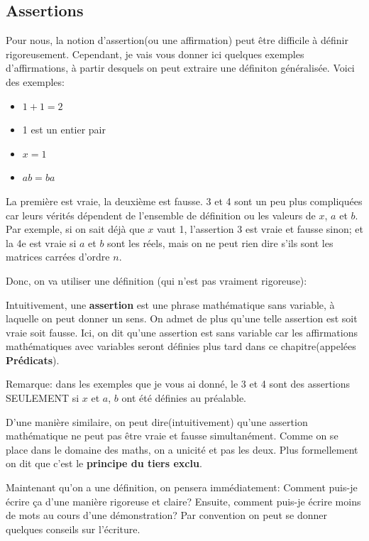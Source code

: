 \documentclass{article}
\begin{document}
\subsection{Assertions}

Pour nous, la notion d'assertion(ou une affirmation) peut être difficile à définir rigoreusement. Cependant, je vais vous donner ici quelques exemples d'affirmations, à partir desquels on peut extraire une définiton généralisée. Voici des exemples:

\begin{itemize}
  \item $1+1=2$
  \item 1 est un entier pair
  \item $x=1$
  \item $ab = ba$
\end{itemize}

La première est vraie, la deuxième est fausse. 3 et 4 sont un peu plus compliquées car leurs vérités dépendent de l'ensemble de définition ou les valeurs de $x$, $a$ et $b$. Par exemple, si on sait déjà que $x$ vaut 1, l'assertion 3 est vraie et fausse sinon; et la 4e est vraie si $a$ et $b$ sont les réels, mais on ne peut rien dire s'ils sont les matrices carrées d'ordre $n$.



Donc, on va utiliser une définition (qui n'est pas vraiment rigoreuse):
\begin{tcolorbox}[colback=red!5!white,colframe=red!75!black,title=Définition 1.1]
  Intuitivement, une \textbf{assertion} est une phrase mathématique sans variable, à laquelle on peut donner un sens. On admet de plus qu'une telle assertion est soit vraie soit fausse.
  \tcblower
  Ici, on dit qu'une assertion est sans variable car les affirmations mathématiques avec variables seront définies plus tard dans ce chapitre(appelées \textbf{Prédicats}).
\end{tcolorbox}

Remarque: dans les exemples que je vous ai donné, le 3 et 4 sont des assertions SEULEMENT si $x$ et $a$, $b$ ont été définies au préalable.

D'une manière similaire, on peut dire(intuitivement) qu'une assertion mathématique ne peut pas être vraie et fausse simultanément. Comme on se place dans le domaine des maths, on a unicité et pas les deux. Plus formellement on dit que c'est le \textbf{principe du tiers exclu}.

Maintenant qu'on a une définition, on pensera immédiatement: Comment puis-je écrire ça d'une manière rigoreuse et claire? Ensuite, comment puis-je écrire moins de mots au cours d'une démonstration? Par convention on peut se donner quelques conseils sur l'écriture. 
\end{document}
